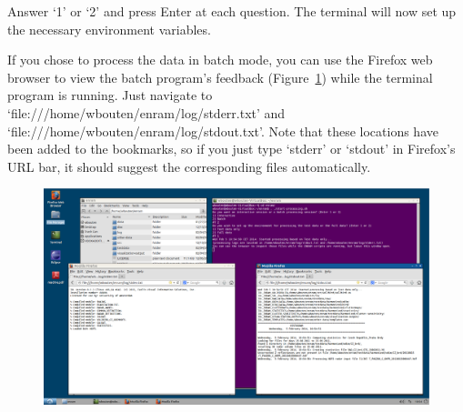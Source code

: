 Answer `1' or `2' and press Enter at each question. The terminal will now set up the necessary environment variables.

If you chose to process the data in batch mode, you can use the Firefox web browser to view the batch program's feedback (Figure~\ref{fig:screenshot-26}) while the terminal program is running. Just navigate to `file:///home/wbouten/enram/log/stderr.txt' and `file:///home/wbouten/enram/log/stdout.txt'. Note that these locations have been added to the bookmarks, so if you just type `stderr' or `stdout' in Firefox's URL bar, it should suggest the corresponding files automatically.

\begin{figure}[ht]
  \centering
    \includegraphics[width=0.85\linewidth , keepaspectratio]{./../eps/screenshot-26.eps}
  \caption{}
  \label{fig:screenshot-26}
\end{figure}
